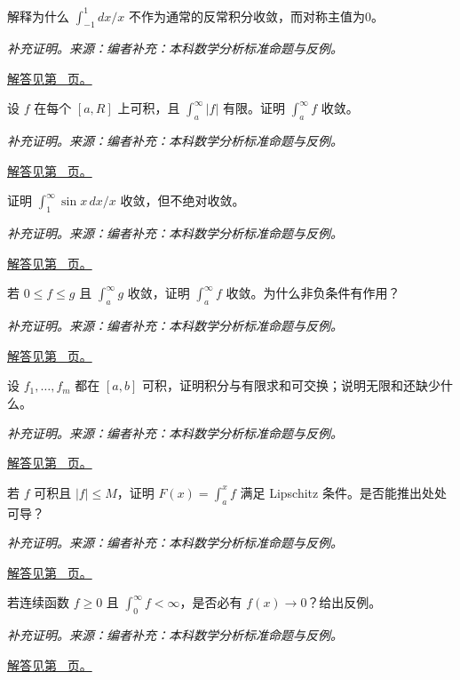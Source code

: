 \documentclass[12pt,fontset=fandol]{ctexart}
\begin{document}
\begin{example}[反常积分的内部奇点]\label{ex:c30q14}
解释为什么 $\int_{-1}^1dx/x$ 不作为通常的反常积分收敛，而对称主值为0。
\par\textit{补充证明。来源：编者补充：本科数学分析标准命题与反例。}\par\hyperref[ans:c30q14]{解答见第~\pageref{ans:c30q14} 页。}
\end{example}
\begin{example}[绝对收敛蕴含积分收敛]\label{ex:c30q15}
设 $f$ 在每个 $[a,R]$ 上可积，且 $\int_a^\infty|f|$ 有限。证明 $\int_a^\infty f$ 收敛。
\par\textit{补充证明。来源：编者补充：本科数学分析标准命题与反例。}\par\hyperref[ans:c30q15]{解答见第~\pageref{ans:c30q15} 页。}
\end{example}
\begin{example}[正弦除以变量的条件收敛]\label{ex:c30q16}
证明 $\int_1^\infty\sin x\,dx/x$ 收敛，但不绝对收敛。
\par\textit{补充证明。来源：编者补充：本科数学分析标准命题与反例。}\par\hyperref[ans:c30q16]{解答见第~\pageref{ans:c30q16} 页。}
\end{example}
\begin{example}[积分比较的条件边界]\label{ex:c30q17}
若 $0\le f\le g$ 且 $\int_a^\infty g$ 收敛，证明 $\int_a^\infty f$ 收敛。为什么非负条件有作用？
\par\textit{补充证明。来源：编者补充：本科数学分析标准命题与反例。}\par\hyperref[ans:c30q17]{解答见第~\pageref{ans:c30q17} 页。}
\end{example}
\begin{example}[求和与积分的有限交换]\label{ex:c30q18}
设 $f_1,\ldots,f_m$ 都在 $[a,b]$ 可积，证明积分与有限求和可交换；说明无限和还缺少什么。
\par\textit{补充证明。来源：编者补充：本科数学分析标准命题与反例。}\par\hyperref[ans:c30q18]{解答见第~\pageref{ans:c30q18} 页。}
\end{example}
\begin{example}\label{ex:c30q19}
若 $f$ 可积且 $|f|\le M$，证明 $F(x)=\int_a^xf$ 满足 Lipschitz 条件。是否能推出处处可导？
\par\textit{补充证明。来源：编者补充：本科数学分析标准命题与反例。}\par\hyperref[ans:c30q19]{解答见第~\pageref{ans:c30q19} 页。}
\end{example}
\begin{example}[非负积分与函数趋零]\label{ex:c30q20}
若连续函数 $f\ge0$ 且 $\int_0^\infty f<\infty$，是否必有 $f(x)\to0$？给出反例。
\par\textit{补充证明。来源：编者补充：本科数学分析标准命题与反例。}\par\hyperref[ans:c30q20]{解答见第~\pageref{ans:c30q20} 页。}
\end{example}
\end{document}
